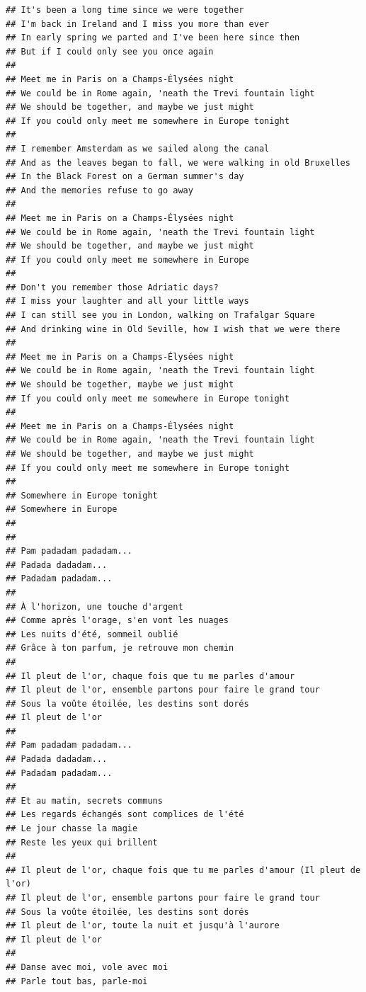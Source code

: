 \documentclass[
]{article}
\begin{document}
\begin{verbatim}
## It's been a long time since we were together
## I'm back in Ireland and I miss you more than ever
## In early spring we parted and I've been here since then
## But if I could only see you once again
## 
## Meet me in Paris on a Champs-Élysées night
## We could be in Rome again, 'neath the Trevi fountain light
## We should be together, and maybe we just might
## If you could only meet me somewhere in Europe tonight
## 
## I remember Amsterdam as we sailed along the canal
## And as the leaves began to fall, we were walking in old Bruxelles
## In the Black Forest on a German summer's day
## And the memories refuse to go away
## 
## Meet me in Paris on a Champs-Élysées night
## We could be in Rome again, 'neath the Trevi fountain light
## We should be together, and maybe we just might
## If you could only meet me somewhere in Europe
## 
## Don't you remember those Adriatic days?
## I miss your laughter and all your little ways
## I can still see you in London, walking on Trafalgar Square
## And drinking wine in Old Seville, how I wish that we were there
## 
## Meet me in Paris on a Champs-Élysées night
## We could be in Rome again, 'neath the Trevi fountain light
## We should be together, maybe we just might
## If you could only meet me somewhere in Europe tonight
## 
## Meet me in Paris on a Champs-Élysées night
## We could be in Rome again, 'neath the Trevi fountain light
## We should be together, and maybe we just might
## If you could only meet me somewhere in Europe tonight
## 
## Somewhere in Europe tonight
## Somewhere in Europe
## 
## 
## Pam padadam padadam...
## Padada dadadam...
## Padadam padadam...
## 
## À l'horizon, une touche d'argent
## Comme après l'orage, s'en vont les nuages
## Les nuits d'été, sommeil oublié
## Grâce à ton parfum, je retrouve mon chemin
## 
## Il pleut de l'or, chaque fois que tu me parles d'amour
## Il pleut de l'or, ensemble partons pour faire le grand tour
## Sous la voûte étoilée, les destins sont dorés
## Il pleut de l'or
## 
## Pam padadam padadam...
## Padada dadadam...
## Padadam padadam...
## 
## Et au matin, secrets communs
## Les regards échangés sont complices de l'été
## Le jour chasse la magie
## Reste les yeux qui brillent
## 
## Il pleut de l'or, chaque fois que tu me parles d'amour (Il pleut de l'or)
## Il pleut de l'or, ensemble partons pour faire le grand tour
## Sous la voûte étoilée, les destins sont dorés
## Il pleut de l'or, toute la nuit et jusqu'à l'aurore
## Il pleut de l'or
## 
## Danse avec moi, vole avec moi
## Parle tout bas, parle-moi

\end{verbatim}
\end{document}
